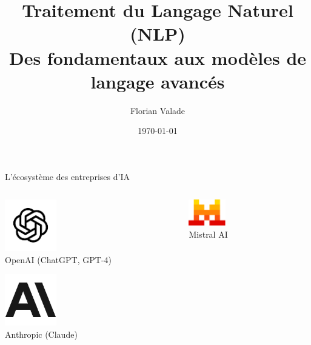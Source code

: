 \documentclass[aspectratio=169]{beamer}
\title{Traitement du Langage Naturel (NLP) \\ \large{Des fondamentaux aux modèles de langage avancés}}
\author{Florian Valade}
\institute{Université Gustave Eiffel}
\date{\today}
\begin{document}
\begin{frame}
    \titlepage
\end{frame}

\begin{frame}{L'écosystème des entreprises d'IA}
    \begin{columns}
        \begin{column}{0.3\textwidth}
            \begin{center}
                \includegraphics[width=0.3\textwidth]{images/openai.png} 
                \\ OpenAI (ChatGPT, GPT-4)
                        
                \vspace{0.5cm}
                \includegraphics[width=0.3\textwidth]{images/anthropic.png}
                \\ Anthropic (Claude)
            \end{center}
        \end{column}
        \begin{column}{0.3\textwidth}
            \begin{center}
                \includegraphics[width=0.3\textwidth]{images/mistral.png} 
                \\ Mistral AI
                
                \vspace{0.5cm}
                

\end{center}
\end{column}
\end{columns}
\end{frame}
\end{document}
